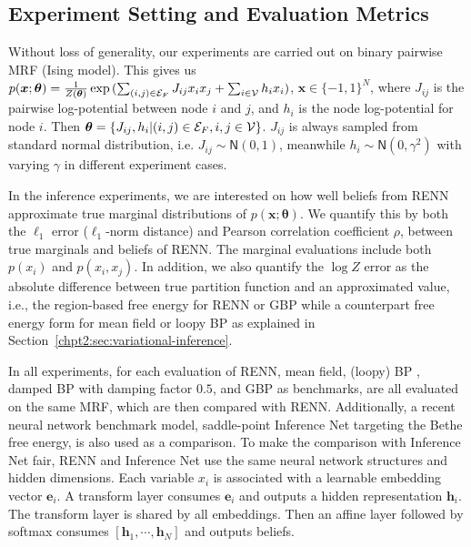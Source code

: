 \subsection{Experiment Setting and Evaluation Metrics}
\label{subsec:exp-setting}
Without loss of generality, our experiments are carried out on binary pairwise MRF (Ising model). This gives us $p(\bm{x}; \bm{\theta}) = \frac{1}{Z(\bm{\theta})}\exp{(\sum_{(i,j)\in \mathcal{E}_F} J_{ij} x_i x_j + \sum_{i\in \mathcal{V}}h_i x_i)}$, $\bm{x} \in \{-1, 1\}^{N}$, where $J_{ij}$ is the pairwise log-potential between node $i$ and $j$, and $h_i$ is the node log-potential for node $i$. Then $\bm{\theta} = \left\{ J_{ij}, h_i| (i,j) \in \mathcal{E}_F, i,j \in \mathcal{V} \right\}$. $J_{ij}$ is always sampled from standard normal distribution, i.e. $J_{ij}\sim \mathsf{N}(0,1)$, meanwhile $h_i \sim \mathsf{N}(0, \gamma^{2})$ with varying $\gamma$ in different experiment cases.

In the inference experiments, we are interested on how well beliefs from RENN approximate true marginal distributions of $p(\bm{x};\bm{\theta})$. We quantify this by both the $\ell_1$ error ($\ell_1$-norm distance) and Pearson correlation coefficient $\rho$, between true marginals and beliefs of RENN. The marginal evaluations include both $p(x_i)$ and $p(x_i,x_j)$. In addition, we also quantify the $\log{Z}$ error as the absolute difference between true partition function and an approximated value, i.e., the region-based free energy for RENN or GBP while a counterpart free energy form for mean field or loopy BP as explained in Section~\ref{chpt2:sec:variational-inference}.

In all experiments, for each evaluation of RENN, mean field, (loopy) BP \cite{mooij2007sufficient}, damped BP \cite{Pretti2005damping} with damping factor $0.5$, and GBP \cite{yedida2005constucting} as benchmarks, are all evaluated on the same MRF, which are then compared with RENN. Additionally, a recent neural network benchmark model, saddle-point Inference Net \cite{NIPS2019_9687} targeting the Bethe free energy, is also used as a comparison. To make the comparison with Inference Net fair, RENN and Inference Net use the same neural network structures and hidden dimensions. Each variable $x_i$ is associated with a learnable embedding vector $\bm{e}_i$. A transform layer \cite{AshishNIPS2017_7181} consumes $\bm{e}_i$ and outputs a hidden representation $\bm{h}_i$. The transform layer is shared by all embeddings. Then an affine layer followed by softmax consumes $[\bm{h}_1, \cdots, \bm{h}_N]$ and outputs beliefs.

